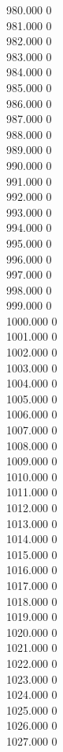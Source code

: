 { 980.000	0 \\
 981.000	0 \\
 982.000	0 \\
 983.000	0 \\
 984.000	0 \\
 985.000	0 \\
 986.000	0 \\
 987.000	0 \\
 988.000	0 \\
 989.000	0 \\
 990.000	0 \\
 991.000	0 \\
 992.000	0 \\
 993.000	0 \\
 994.000	0 \\
 995.000	0 \\
 996.000	0 \\
 997.000	0 \\
 998.000	0 \\
 999.000	0 \\
 1000.000	0 \\
 1001.000	0 \\
 1002.000	0 \\
 1003.000	0 \\
 1004.000	0 \\
 1005.000	0 \\
 1006.000	0 \\
 1007.000	0 \\
 1008.000	0 \\
 1009.000	0 \\
 1010.000	0 \\
 1011.000	0 \\
 1012.000	0 \\
 1013.000	0 \\
 1014.000	0 \\
 1015.000	0 \\
 1016.000	0 \\
 1017.000	0 \\
 1018.000	0 \\
 1019.000	0 \\
 1020.000	0 \\
 1021.000	0 \\
 1022.000	0 \\
 1023.000	0 \\
 1024.000	0 \\
 1025.000	0 \\
 1026.000	0 \\
 1027.000	0 \\
}
